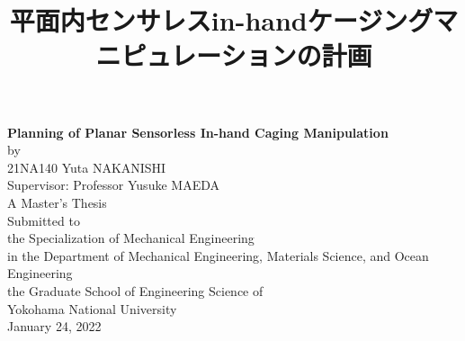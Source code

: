 \documentclass[a4paper,twoside,12pt,papersize, dvipdfmx]{iirthesis}
\begin{document}
%

 \pagestyle{empty}		%
 \title{\Huge{平面内センサレスin-handケージングマニピュレーションの計画}}
 \etitle{}
 \author{}
 \eauthor{}
 \maketitle

\pagestyle{empty}
\cleardoublepage
\begin{center}
    \vspace{12em}
    \Large
{\sffamily \bfseries \huge{Planning of Planar Sensorless In-hand Caging Manipulation}}\\
    \vspace{2em}
    {\LARGE by}\\
    \vspace{2em}
    {\LARGE 21NA140 Yuta NAKANISHI}\\
    \vspace{9em}
    Supervisor: Professor Yusuke MAEDA\\
    \vspace{2em}
    A Master's Thesis\\
    Submitted to\\
    the Specialization of Mechanical Engineering\\
    in the Department of Mechanical Engineering, Materials Science, and Ocean Engineering\\
    the Graduate School of Engineering Science of\\
    Yokohama National University\\
    \vspace{3em}
    January 24, 2022
\end{center}

\cleardoublepage	%
\end{document}
